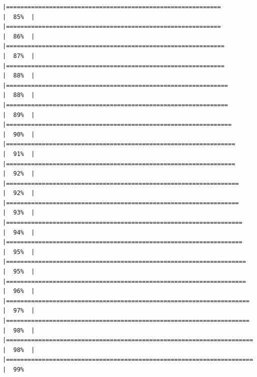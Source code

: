 \documentclass[
]{article}
\begin{document}
\begin{verbatim}
|============================================================          |  85%  |                                                                              |============================================================          |  86%  |                                                                              |=============================================================         |  87%  |                                                                              |=============================================================         |  88%  |                                                                              |==============================================================        |  88%  |                                                                              |==============================================================        |  89%  |                                                                              |===============================================================       |  90%  |                                                                              |================================================================      |  91%  |                                                                              |================================================================      |  92%  |                                                                              |=================================================================     |  92%  |                                                                              |=================================================================     |  93%  |                                                                              |==================================================================    |  94%  |                                                                              |==================================================================    |  95%  |                                                                              |===================================================================   |  95%  |                                                                              |===================================================================   |  96%  |                                                                              |====================================================================  |  97%  |                                                                              |====================================================================  |  98%  |                                                                              |===================================================================== |  98%  |                                                                              |===================================================================== |  99%
\end{verbatim}
\end{document}
